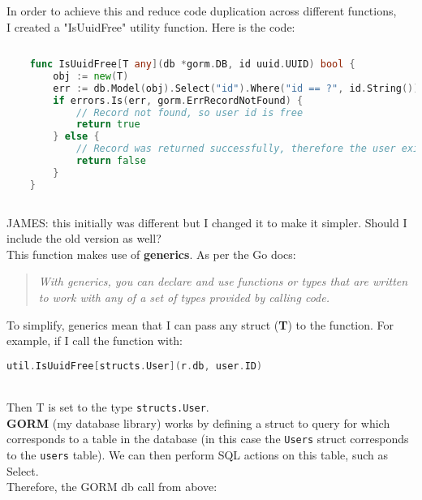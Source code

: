\documentclass[../../main.tex]{subfiles}
\begin{document}
\noindent In order to achieve this and reduce code duplication across different functions, \\
I created a "IsUuidFree" utility function. Here is the code:

\begin{lstlisting}[language=Go]
    
    func IsUuidFree[T any](db *gorm.DB, id uuid.UUID) bool {
        obj := new(T)
        err := db.Model(obj).Select("id").Where("id == ?", id.String()).First(&obj).Error
        if errors.Is(err, gorm.ErrRecordNotFound) {
            // Record not found, so user id is free
            return true
        } else {
            // Record was returned successfully, therefore the user exists
            return false
        }
    }
    
    \end{lstlisting}

JAMES: this initially was different but I changed it to make it simpler. Should I include the old version as well?\\

\noindent This function makes use of \textbf{generics}. As per the Go docs:

\begin{quotation}
    \textit{
        With generics, you can declare and use functions or types that are written to work with any of a set of types provided by calling code.
    }
\end{quotation}

\noindent To simplify, generics mean that I can pass any struct (\textbf{T}) to the function.
For example, if I call the function with:\\

\begin{lstlisting}[language=Go]
        util.IsUuidFree[structs.User](r.db, user.ID)
    \end{lstlisting}

\noindent \\Then T is set to the type \lstinline{structs.User}.\\

\noindent \textbf{GORM} (my database library) works by defining a struct to query for which corresponds to a table in the database (in this case the \lstinline{Users} struct corresponds to the \lstinline{users} table). We can then perform SQL actions on this table, such as Select. \\

\noindent Therefore, the GORM db call from above:
\end{document}
